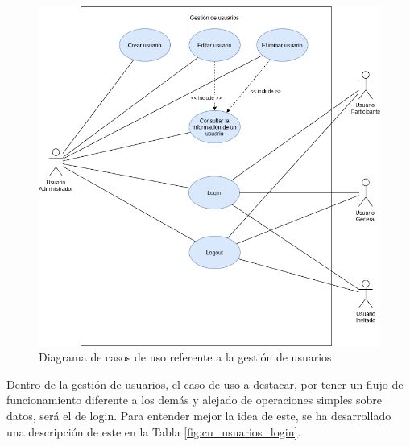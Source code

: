 \begin{figure}[hp!]
    \centering
    \includegraphics[width=1\linewidth]{diseno/sistema/CU/usuarios.png}
    \caption{Diagrama de casos de uso referente a la gestión de usuarios}
    \label{fig:cu_usuarios}
\end{figure}

Dentro de la gestión de usuarios, el caso de uso a destacar, por tener un flujo de funcionamiento diferente a los demás y alejado de operaciones simples sobre datos, será el de login. Para entender mejor la idea de este, se ha desarrollado una descripción de este en la Tabla \ref{fig:cu_usuarios_login}.

